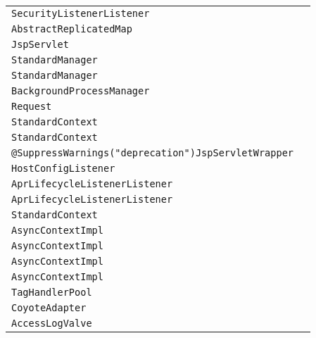 \begin{center}
\begin{tabular}{ll}
\lstinline/SecurityListenerListener/&\raisebox{0pt}{\lstinline/ checkUmask()/}\\ 
\lstinline/AbstractReplicatedMap/&\raisebox{0pt}{\lstinline/ Vput()/}\\ 
\lstinline/JspServlet/&\raisebox{0pt}{\lstinline/ handleMissingResource(HttpServletRequest)/}\\ 
\lstinline/StandardManager/&\raisebox{0pt}{\lstinline/ stopInternal())/}\\ 
\lstinline/StandardManager/&\raisebox{0pt}{\lstinline/ stopInternal())/}\\ 
\lstinline/BackgroundProcessManager/&\raisebox{0pt}{\lstinline/ process()/}\\ 
\lstinline/Request/&\raisebox{0pt}{\lstinline/ getUserPrincipal()/}\\ 
\lstinline/StandardContext/&\raisebox{0pt}{\lstinline/ checkUnusualURLPattern(String)/}\\ 
\lstinline/StandardContext/&\raisebox{0pt}{\lstinline/ checkUnusualURLPattern(String)/}\\ 
\lstinline/@SuppressWarnings("deprecation")JspServletWrapper/&\raisebox{0pt}{\lstinline/ destroy()/}\\ 
\lstinline/HostConfigListener/&\raisebox{0pt}{\lstinline/ checkUndeploy()/}\\ 
\lstinline/AprLifecycleListenerListener/&\raisebox{0pt}{\lstinline/ initializeSSL())/}\\ 
\lstinline/AprLifecycleListenerListener/&\raisebox{0pt}{\lstinline/ initializeSSL())/}\\ 
\lstinline/StandardContext/&\raisebox{0pt}{\lstinline/ checkUnusualURLPattern(String)/}\\ 
\lstinline/AsyncContextImpl/&\raisebox{0pt}{\lstinline/ setErrorState(Throwable)/}\\ 
\lstinline/AsyncContextImpl/&\raisebox{0pt}{\lstinline/ setErrorState(Throwable)/}\\ 
\lstinline/AsyncContextImpl/&\raisebox{0pt}{\lstinline/ setErrorState(Throwable)/}\\ 
\lstinline/AsyncContextImpl/&\raisebox{0pt}{\lstinline/ setErrorState(Throwable)/}\\ 
\lstinline/TagHandlerPool/&\raisebox{0pt}{\lstinline/ doRelease(Taghandler)/}\\ 
\lstinline/CoyoteAdapter/&\raisebox{0pt}{\lstinline/ convertURI(MessageBytesuri,Requestrequest)/}\\ 
\lstinline/AccessLogValve/&\raisebox{0pt}{\lstinline/ open()/}\\ 

\end{tabular}
\end{center}
